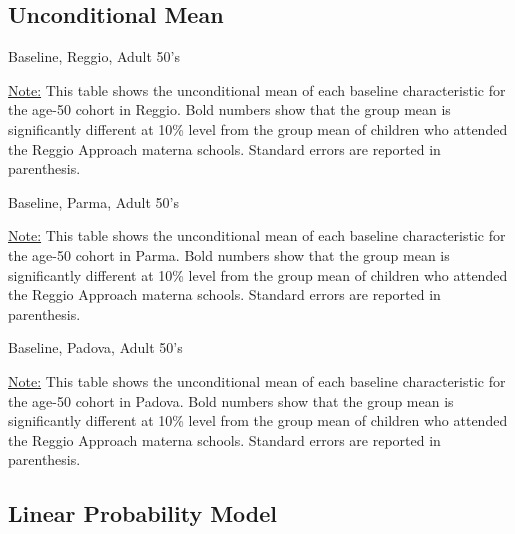 \documentclass[12pt]{article}
\begin{document}
\subsection{Unconditional Mean}
\begin{table}[H]
\caption{Baseline, Reggio, Adult 50's} \label{tab:base-reggio-age50}
\begin{center}
\scalebox{0.8}{

}
\end{center}
\begin{footnotesize}
\vspace{0.5mm} 

\underline{Note:} This table shows the unconditional mean of each baseline characteristic for the age-50 cohort in Reggio. Bold numbers show that the group mean is significantly different at 10\% level from the group mean of children who attended the Reggio Approach materna schools. Standard errors are reported in parenthesis. 
\end{footnotesize}
\end{table}

\begin{table}[H]
\caption{Baseline, Parma, Adult 50's} \label{tab:base-parma-age50}
\begin{center}
\scalebox{0.8}{

}
\end{center}
\begin{footnotesize}
\vspace{0.5mm} 

\underline{Note:} This table shows the unconditional mean of each baseline characteristic for the age-50 cohort in Parma. Bold numbers show that the group mean is significantly different at 10\% level from the group mean of children who attended the Reggio Approach materna schools. Standard errors are reported in parenthesis. 
\end{footnotesize}
\end{table}

\begin{table}[H]
\caption{Baseline, Padova, Adult 50's} \label{tab:base-padova-age50}
\begin{center}
\scalebox{0.8}{

}
\end{center}
\begin{footnotesize}
\vspace{0.5mm} 

\underline{Note:} This table shows the unconditional mean of each baseline characteristic for the age-50 cohort in Padova. Bold numbers show that the group mean is significantly different at 10\% level from the group mean of children who attended the Reggio Approach materna schools. Standard errors are reported in parenthesis. 
\end{footnotesize}
\end{table}

\subsection{Linear Probability Model}



\end{document}
